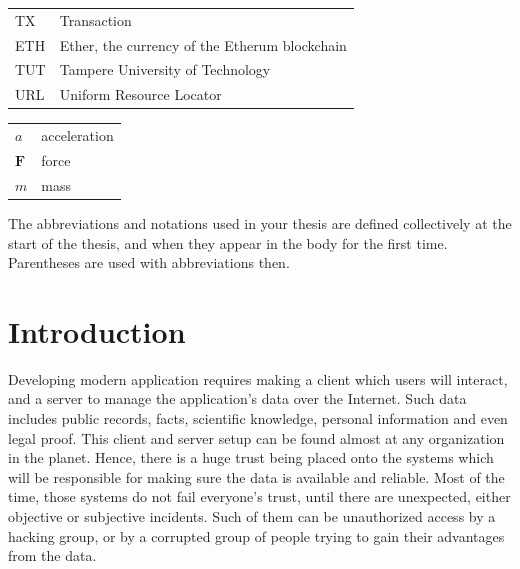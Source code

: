 \documentclass[twoside,numperchapter]{tutthesis} %
\begin{document}

\begin{tabular}[h]{@{} p{} p{} @{}}
TX & Transaction \\
ETH & Ether, the currency of the Etherum blockchain \\
TUT & Tampere University of Technology \\
URL & Uniform Resource Locator 
\end{tabular}

\begin{tabular}[h]{@{} p{} p{} @{}}
$a$ & acceleration \\
$\mathbf{F}$ & force \\
$m$ & mass
\end{tabular}

The abbreviations and notations used in your thesis are defined collectively at the start of the thesis, and when they appear in the body for the first time.
Parentheses are used with abbreviations then.



\chapter{Introduction}
\label{ch:Introduction}

Developing modern application requires making a client which users will interact, and a server to manage the application's data over the Internet. Such data includes public records, facts, scientific knowledge, personal information and even legal proof. This client and server setup can be found almost at any organization in the planet. Hence, there is a huge trust being placed onto the systems which will be responsible for making sure the data is available and reliable. Most of the time, those systems do not fail everyone's trust, until there are unexpected, either objective or subjective incidents. Such of them can be unauthorized access by a hacking group, or by a corrupted group of people trying to gain their advantages from the data.
\end{document}
